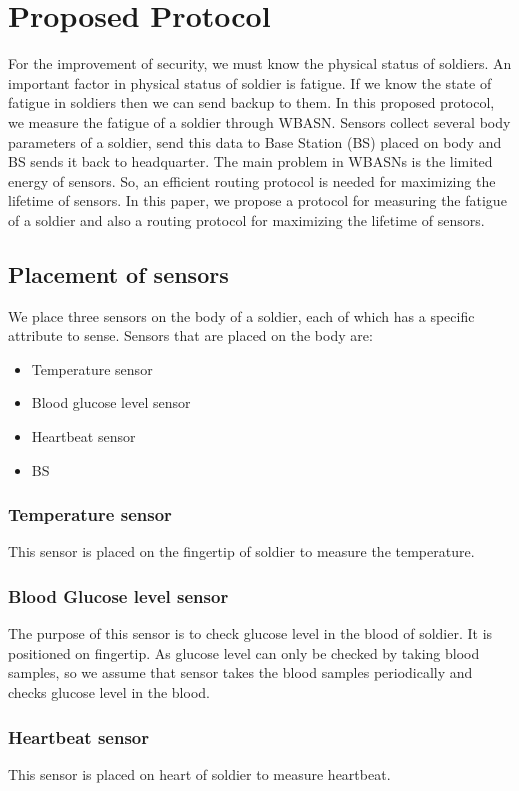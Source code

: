 \documentclass[journal]{IEEEtran}
\begin{document}
\section{Proposed Protocol}
 For the improvement of security, we must know the physical status of soldiers. An important factor in physical status of soldier is fatigue. If we know the state
  of fatigue in soldiers then we can send backup to them. In this proposed protocol, we measure the fatigue of a soldier through WBASN. Sensors collect several
  body parameters of a soldier, send this data to Base Station (BS) placed on body and BS sends it back to headquarter. The main problem in WBASNs is the limited
  energy of sensors. So, an efficient routing protocol is needed for maximizing the lifetime of sensors. In this paper, we propose a protocol for measuring the
  fatigue of a soldier and also a routing protocol for maximizing the lifetime of sensors.
\subsection{Placement of sensors}
We place three sensors on the body of a soldier, each of which has a specific attribute to sense. Sensors that are placed on the body are:

\begin{itemize}
\renewcommand{\labelitemi}{$\rightarrow$}
\item Temperature sensor
\item Blood glucose level sensor
\item Heartbeat sensor
\item BS
\end{itemize}


\subsubsection{Temperature sensor}
This sensor is placed on the fingertip of soldier to measure the temperature.
\subsubsection{Blood Glucose level sensor}
The purpose of this sensor is to check glucose level in the blood of soldier. It is positioned on fingertip. As glucose level can only be checked by taking
blood samples, so we assume that sensor takes the blood samples periodically and checks glucose level in the blood.
\subsubsection{Heartbeat sensor}
This sensor is placed on heart of soldier to measure heartbeat.
\end{document}

